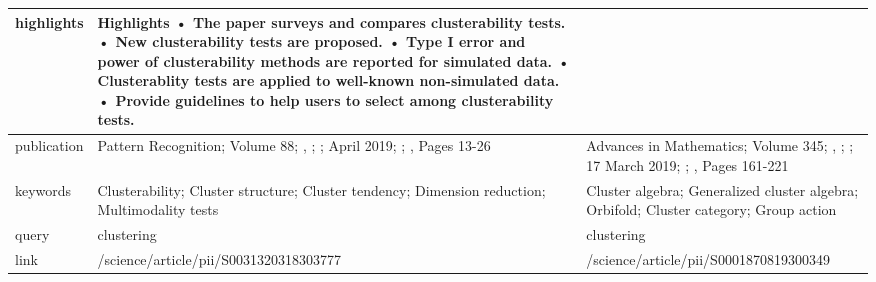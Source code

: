 \documentclass[12pt]{article}
\begin{document}
\begin{center}
{\begin{tabularx}{\linewidth}{|l|X|X|}
		\hline
		highlights  &  Highlights • The paper surveys and compares clusterability tests. • New clusterability tests are proposed. • Type I error and power of clusterability methods are reported for simulated data. • Clusterablity tests are applied to well-known non-simulated data. • Provide guidelines to help users to select among clusterability tests. &   \\
		\hline
		publication &  Pattern Recognition; Volume 88; , ;  ; April 2019;  ; , Pages 13-26 &  Advances in Mathematics; Volume 345; , ;  ; 17 March 2019;  ; , Pages 161-221 \\
		\hline
		keywords    &  Clusterability; Cluster structure; Cluster tendency; Dimension reduction; Multimodality tests &  Cluster algebra; Generalized cluster algebra; Orbifold; Cluster category; Group action \\
		\hline
		query       &  clustering &  clustering \\
		\hline
		link        &  /science/article/pii/S0031320318303777 &  /science/article/pii/S0001870819300349 \\
		\hline
	\end{tabularx}}
\end{center}
\end{document}
